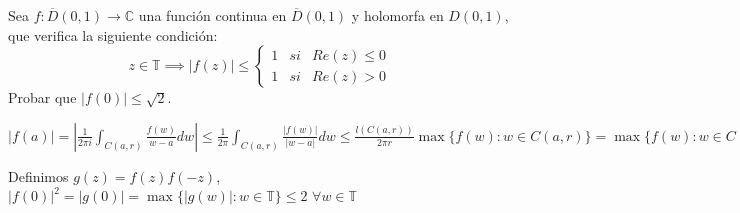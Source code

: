 \begin{ejer}
	Sea $f:\overline{D}(0,1)\rightarrow\mathbb{C}$ una función continua en $\overline{D}(0,1)$ y holomorfa en $D(0,1)$, que verifica la siguiente condición:
	$$ z\in\mathbb{T} \implies |f(z)| \leq \left\{ \begin{array}{lcc}
	1 &  si  & Re(z) \leq 0 \\
	1 &  si  & Re(z) > 0
	\end{array}
	\right. $$
	Probar que $|f(0)| \leq \sqrt{2}$.
\end{ejer}
\begin{sol}
$|f(a)| = \left| \frac{1}{2\pi i}\int_{C(a,r)} \frac{f(w)}{w-a} dw \right| \leq \frac{1}{2\pi} \int_{C(a,r)} \frac{|f(w)|}{|w-a|} dw \leq \frac{l(C(a,r))}{2\pi r} \max\{ f(w) : w\in C(a,r) \} = \max\{ f(w) : w\in C(a,r) \} $

Definimos $g(z) = f(z)f(-z)$, 
$|f(0)|^2 = |g(0)| = \max\{ |g(w)| : w\in\mathbb{T} \} \leq 2$ $\forall w\in\mathbb{T}$
\end{sol}


